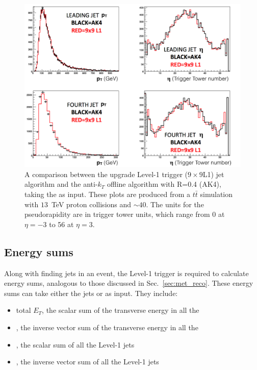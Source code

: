 \begin{figure}
	\begin{center}
		\includegraphics[width=1.0\linewidth]{figs/trigger/jet_l1s2_compak4}
	\end{center}
  \caption{A comparison between the upgrade Level-1 trigger ($9\times9$L1) jet
  algorithm and the anti-$k_T$ offline algorithm with R=0.4 
  (AK4), taking
  the \TTs as input.  These plots are produced from a
  $t\bar{t}$ simulation with $13$~TeV proton collisions and \PU $\sim40$.
  The units for the pseudorapidity are in trigger tower units, which
  range from 0 at $\eta =-3$ to 56 at $\eta=3$.}
	\label{fig:ak4_comp}
\end{figure}

\subsection{Energy sums}

Along with finding jets in an event, the Level-1 trigger is required
to calculate energy sums, analogous to those discussed in
Sec.~\ref{sec:met_reco}.  These energy sums can take either the jets
or \TTs as input. They include:
\begin{itemize}
\item{total $E_T$, the scalar sum of the transverse energy in all the
\TTs}
\item{\met, the inverse vector sum of the transverse energy in all the
\TTs}
\item{\HT, the scalar sum of all the Level-1 jets}
\item{\MHT, the inverse vector sum of all the Level-1 jets}
\end{itemize}


